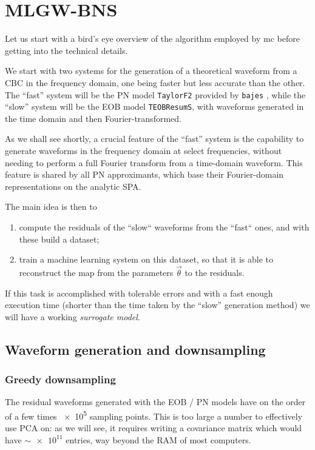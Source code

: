 \documentclass[main.tex]{subfiles}
\begin{document}
\section{MLGW-BNS}

Let us start with a bird's eye overview of the algorithm employed by \ac{mc} before getting into the technical details. 

We start with two systems for the generation of a theoretical waveform from a \ac{CBC} in the frequency domain, one being faster but less accurate than the other. 
The ``fast'' system will be the \ac{PN} model \texttt{TaylorF2} provided by \texttt{bajes} \cite[]{breschiTtBajesBayesian2021}, while the ``slow'' system will be the \ac{EOB} model \texttt{TEOBResumS}, with waveforms generated in the time domain and then Fourier-transformed. 

As we shall see shortly, a crucial feature of the ``fast'' system is the capability to generate waveforms in the frequency domain at select frequencies, without needing to perform a full Fourier transform from a time-domain waveform.
This feature is shared by all \ac{PN} approximants, which base their Fourier-domain representations on the analytic \ac{SPA}.

The main idea is then to 
\begin{enumerate}
    \item compute the residuals of the ``slow`` waveforms from the ``fast`` ones, and with these build a dataset;
    \item train a machine learning system on this dataset, so that it is able to reconstruct the map from the parameters \(\vec{\theta}\) to the residuals.
\end{enumerate}

If this task is accomplished with tolerable errors and with a fast enough execution time (shorter than the time taken by the ``slow'' generation method) we will have a working \emph{surrogate model}. 

\subsection{Waveform generation and downsampling}

\subsubsection{Greedy downsampling}

The residual waveforms generated with the \ac{EOB} / \ac{PN} models have on the order of a few times \num{e5} sampling points. 
This is too large a number to effectively use \ac{PCA} on: as we will see, it requires writing a covariance matrix which would have \(\sim \num{e11}\) entries, way beyond the \ac{RAM} of most computers. 
\end{document}

